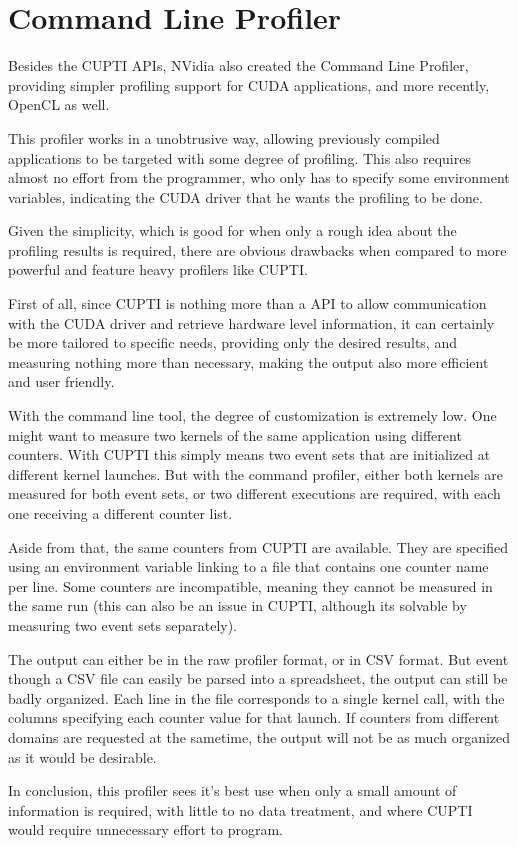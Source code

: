 \section{Command Line Profiler}
\label{sec:330}

Besides the CUPTI APIs, NVidia also created the Command Line Profiler, providing simpler profiling support for CUDA applications, and more recently, OpenCL as well.

This profiler works in a unobtrusive way, allowing previously compiled applications to be targeted with some degree of profiling. This also requires almost no effort from the programmer, who only has to specify some environment variables, indicating the CUDA driver that he wants the profiling to be done.

Given the simplicity, which is good for when only a rough idea about the profiling results is required, there are obvious drawbacks when compared to more powerful and feature heavy profilers like CUPTI.

First of all, since CUPTI is nothing more than a API to allow communication with the CUDA driver and retrieve hardware level information, it can certainly be more tailored to specific needs, providing only the desired results, and measuring nothing more than necessary, making the output also more efficient and user friendly.

With the command line tool, the degree of customization is extremely low. One might want to measure two kernels of the same application using different counters. With CUPTI this simply means two event sets that are initialized at different kernel launches. But with the command profiler, either both kernels are measured for both event sets, or two different executions are required, with each one receiving a different counter list.

Aside from that, the same counters from CUPTI are available. They are specified using an environment variable linking to a file that contains one counter name per line. Some counters are incompatible, meaning they cannot be measured in the same run (this can also be an issue in CUPTI, although its solvable by measuring two event sets separately).

The output can either be in the raw profiler format, or in CSV format. But event though a CSV file can easily be parsed into a spreadsheet, the output can still be badly organized. Each line in the file corresponds to a single kernel call, with the columns specifying each counter value for that launch. If counters from different domains are requested at the sametime, the output will not be as much organized as it would be desirable.

In conclusion, this profiler sees it's best use when only a small amount of information is required, with little to no data treatment, and where CUPTI would require unnecessary effort to program.